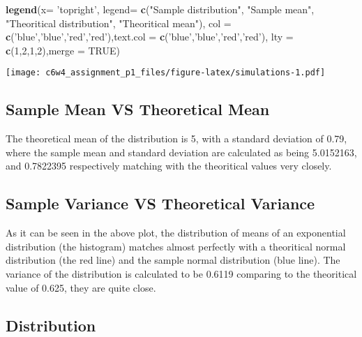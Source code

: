 \documentclass[]{article}
\newenvironment{Shaded}{\begin{snugshade}}{\end{snugshade}}
\newcommand{\DataTypeTok}[1]{\textcolor[rgb]{0.13,0.29,0.53}{#1}}
\newcommand{\DecValTok}[1]{\textcolor[rgb]{0.00,0.00,0.81}{#1}}
\newcommand{\KeywordTok}[1]{\textcolor[rgb]{0.13,0.29,0.53}{\textbf{#1}}}
\newcommand{\NormalTok}[1]{#1}
\newcommand{\OtherTok}[1]{\textcolor[rgb]{0.56,0.35,0.01}{#1}}
\newcommand{\StringTok}[1]{\textcolor[rgb]{0.31,0.60,0.02}{#1}}
\begin{document}
\begin{Shaded}
\begin{Highlighting}[]
\KeywordTok{legend}\NormalTok{(}\DataTypeTok{x=} \StringTok{'topright'}\NormalTok{, }\DataTypeTok{legend=} \KeywordTok{c}\NormalTok{(}\StringTok{"Sample distribution"}\NormalTok{, }\StringTok{"Sample mean"}\NormalTok{, }\StringTok{"Theoritical distribution"}\NormalTok{, }\StringTok{"Theoritical mean"}\NormalTok{), }\DataTypeTok{col =} \KeywordTok{c}\NormalTok{(}\StringTok{'blue'}\NormalTok{,}\StringTok{'blue'}\NormalTok{,}\StringTok{'red'}\NormalTok{,}\StringTok{'red'}\NormalTok{),}\DataTypeTok{text.col =} \KeywordTok{c}\NormalTok{(}\StringTok{'blue'}\NormalTok{,}\StringTok{'blue'}\NormalTok{,}\StringTok{'red'}\NormalTok{,}\StringTok{'red'}\NormalTok{), }\DataTypeTok{lty =} \KeywordTok{c}\NormalTok{(}\DecValTok{1}\NormalTok{,}\DecValTok{2}\NormalTok{,}\DecValTok{1}\NormalTok{,}\DecValTok{2}\NormalTok{),}\DataTypeTok{merge =} \OtherTok{TRUE}\NormalTok{)}
\end{Highlighting}
\end{Shaded}

\texttt{[image: c6w4\_assignment\_p1\_files/figure-latex/simulations-1.pdf]}

\hypertarget{sample-mean-vs-theoretical-mean}{%
\subsection{Sample Mean VS Theoretical
Mean}\label{sample-mean-vs-theoretical-mean}}

The theoretical mean of the distribution is 5, with a standard deviation
of 0.79, where the sample mean and standard deviation are calculated as
being 5.0152163, and 0.7822395 respectively matching with the
theoritical values very closely.

\hypertarget{sample-variance-vs-theoretical-variance}{%
\subsection{Sample Variance VS Theoretical
Variance}\label{sample-variance-vs-theoretical-variance}}

As it can be seen in the above plot, the distribution of means of an
exponential distribution (the histogram) matches almost perfectly with a
theoritical normal distribution (the red line) and the sample normal
distribution (blue line). The variance of the distribution is calculated
to be 0.6119 comparing to the theoritical value of 0.625, they are quite
close.

\hypertarget{distribution}{%
\subsection{Distribution}\label{distribution}}
\end{document}
